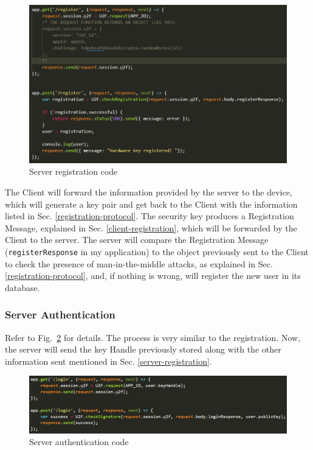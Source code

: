 \begin{figure}[h]
    \centering
    \includegraphics[width=\linewidth]{resources/register-code-server-2.jpg}
      \caption{Server registration code}
      \label{fig:server-registration}
\end{figure}

The Client will forward the information provided by the server to the device, which will generate a key pair and get back to the Client with the information listed in Sec. \ref{registration-protocol}. The security key produces a Registration Message, explained in Sec. \ref{client-registration}, which will be forwarded by the Client to the server. The server will compare the Registration Message (\texttt{registerResponse} in my application) to the object previously sent to the Client to check the presence of man-in-the-middle attacks, as explained in Sec. \ref{registration-protocol}, and, if nothing is wrong, will register the new user in its database.

\subsubsection{Server Authentication}\label{server-authentication}
Refer to Fig.~\ref{fig:server-authentication} for details. The process is very similar to the registration. Now, the server will send the key Handle previously stored along with the other information sent mentioned in Sec. \ref{server-registration}.

\begin{figure}[h]
    \centering
    \includegraphics[width=\linewidth]{resources/login-server-code.jpg}
      \caption{Server authentication code}
      \label{fig:server-authentication}
\end{figure}

